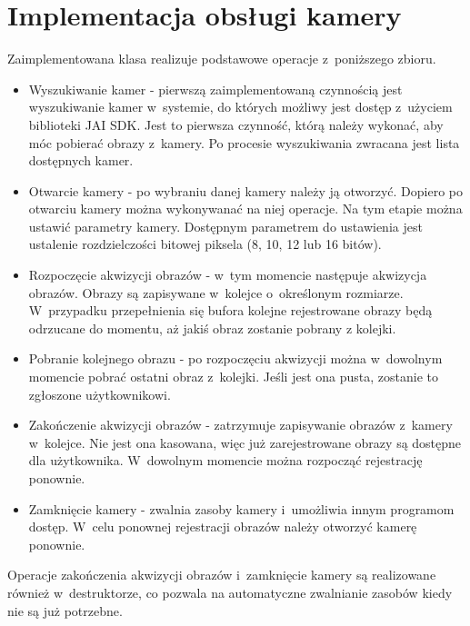 \section{Implementacja obsługi kamery}
\label{sec:implementacjaKamery}

Zaimplementowana klasa realizuje podstawowe operacje z~poniższego zbioru. 
\begin{itemize}
\item Wyszukiwanie kamer - pierwszą zaimplementowaną czynnością jest wyszukiwanie kamer w~systemie, do których możliwy jest dostęp z~użyciem biblioteki JAI SDK. Jest to pierwsza czynność, którą należy wykonać, aby móc pobierać obrazy z~kamery. Po procesie wyszukiwania zwracana jest lista dostępnych kamer.
\item Otwarcie kamery - po wybraniu danej kamery należy ją otworzyć. Dopiero po otwarciu kamery można wykonywanać na niej operacje. Na tym etapie można ustawić parametry kamery. Dostępnym parametrem do ustawienia jest ustalenie rozdzielczości bitowej piksela (8, 10, 12 lub 16 bitów).
\item Rozpoczęcie akwizycji obrazów - w~tym momencie następuje akwizycja obrazów. Obrazy są zapisywane w~kolejce o~określonym rozmiarze. W~przypadku przepełnienia się bufora kolejne rejestrowane obrazy będą odrzucane do momentu, aż jakiś obraz zostanie pobrany z kolejki.
\item Pobranie kolejnego obrazu - po rozpoczęciu akwizycji można w~dowolnym momencie pobrać ostatni obraz z~kolejki. Jeśli jest ona pusta, zostanie to zgłoszone użytkownikowi.
\item Zakończenie akwizycji obrazów - zatrzymuje zapisywanie obrazów z~kamery w~kolejce. Nie jest ona kasowana, więc już zarejestrowane obrazy są dostępne dla użytkownika. W~dowolnym momencie można rozpocząć rejestrację ponownie.
\item Zamknięcie kamery - zwalnia zasoby kamery i~umożliwia innym programom dostęp. W~celu ponownej rejestracji obrazów należy otworzyć kamerę ponownie.
\end{itemize}
Operacje zakończenia akwizycji obrazów i~zamknięcie kamery są realizowane również w~destruktorze, co pozwala na automatyczne zwalnianie zasobów kiedy nie są już potrzebne.